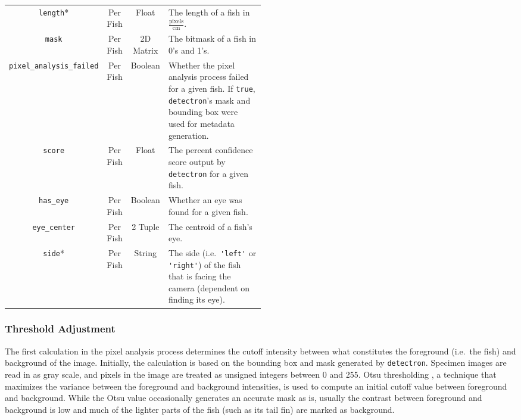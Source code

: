 \documentclass[conference]{IEEEtran}
\begin{document}
\begin{table}[t]
\begin{tabular}{cccp{0.5\linewidth}}
        \verb|length|* & Per Fish & Float & The length of a fish in \(\frac{\mathrm{pixels}}{\mathrm{cm}}\).\\
        \verb|mask| & Per Fish & 2D Matrix & The bitmask of a fish in 0's and 1's.\\
        \verb|pixel_analysis_failed| & Per Fish & Boolean & Whether the pixel analysis process failed for a given fish. If \verb|true|, \verb|detectron|'s mask and bounding box were used for metadata generation.\\
        \verb|score| & Per Fish & Float & The percent confidence score output by \verb|detectron| for a given fish.\\
        \verb|has_eye| & Per Fish & Boolean & Whether an eye was found for a given fish.\\
        \verb|eye_center| & Per Fish & 2 Tuple & The centroid of a fish's eye.\\
        \verb|side|* & Per Fish & String & The side (i.e.\ \verb|'left'| or \verb|'right'|) of the fish that is facing the camera (dependent on finding its eye).\\
      \bottomrule
\end{tabular}
\end{table}

\subsubsection{Threshold Adjustment}
The first calculation in the pixel analysis process determines the cutoff intensity between what constitutes the foreground (i.e.~the fish) and background of the image.
Initially, the calculation is based on the bounding box and mask generated by
\verb|detectron|. Specimen images are read in as gray scale, and pixels in the image are treated as unsigned integers between 0 and 255.
Otsu thresholding \cite{Otsu1979ATS}, a technique that maximizes the variance between the 
foreground and background intensities, is used to compute an initial cutoff value between foreground and background. 
While the Otsu value occasionally generates an accurate mask as is, usually
the contrast between foreground and background is low and much of the lighter parts of the fish (such as its tail fin) are marked as background.
\end{document}
